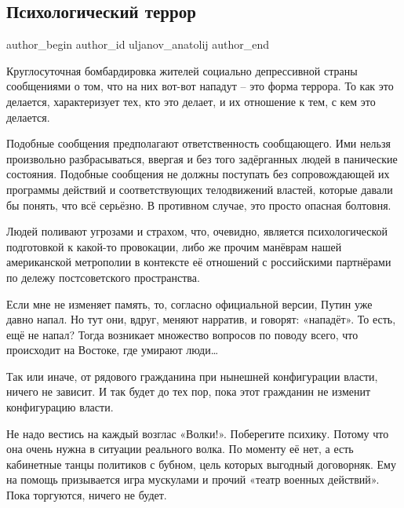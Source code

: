  
 
 
 
 
 
\subsection{Психологический террор}
\label{sec:20_01_2022.fb.uljanov_anatolij.1.psiho_terror}
 
\ifcmt
 author_begin
   author_id uljanov_anatolij
 author_end
\fi

Круглосуточная бомбардировка жителей социально депрессивной страны сообщениями
о том, что на них вот-вот нападут – это форма террора. То как это делается,
характеризует тех, кто это делает, и их отношение к тем, с кем это делается. 


Подобные сообщения предполагают ответственность сообщающего. Ими нельзя
произвольно разбрасываться, ввергая и без того задёрганных людей в панические
состояния. Подобные сообщения не должны поступать без сопровождающей их
программы действий и соответствующих телодвижений властей, которые давали бы
понять, что всё серьёзно. В противном случае, это просто опасная болтовня.

Людей поливают угрозами и страхом, что, очевидно, является психологической
подготовкой к какой-то провокации, либо же прочим манёврам нашей американской
метрополии в контексте её отношений с российскими партнёрами по дележу
постсоветского пространства.

Если мне не изменяет память, то, согласно официальной версии, Путин уже давно
напал. Но тут они, вдруг, меняют нарратив, и говорят: «нападёт». То есть, ещё
не напал? Тогда возникает множество вопросов по поводу всего, что происходит на
Востоке, где умирают люди…

Так или иначе, от рядового гражданина при нынешней конфигурации власти, ничего
не зависит. И так будет до тех пор, пока этот гражданин не изменит конфигурацию
власти. 

Не надо вестись на каждый возглас «Волки!». Поберегите психику. Потому что она
очень нужна в ситуации реального волка. По моменту её нет, а есть кабинетные
танцы политиков с бубном, цель которых выгодный договорняк. Ему на помощь
призывается игра мускулами и прочий «театр военных действий». Пока торгуются,
ничего не будет.

